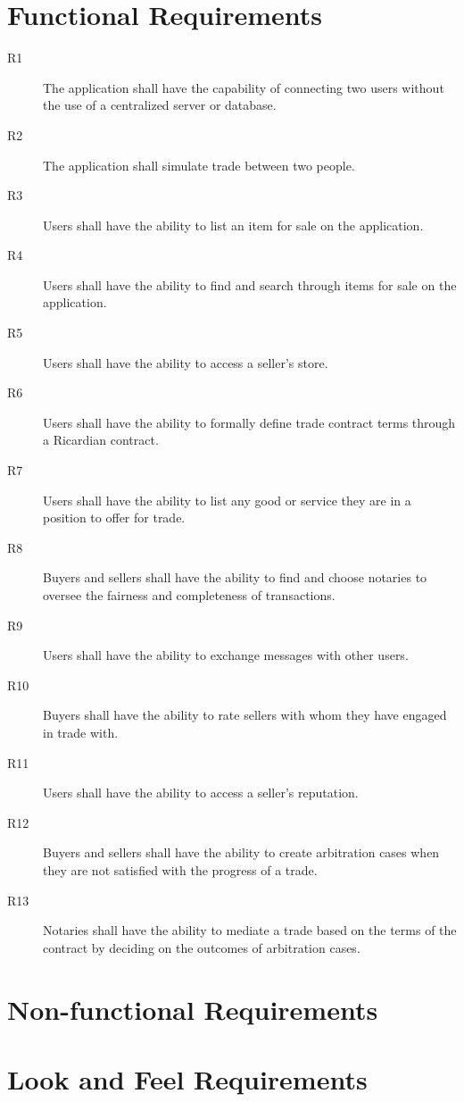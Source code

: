 \documentclass{article}
\begin{document}
\section*{Functional Requirements}
\begin{description}
\item[R1]
The application shall have the capability of connecting two users without the use of a centralized server or database.
\item[R2]
The application shall simulate trade between two people.
\item[R3]
Users shall have the ability to list an item for sale on the application.
\item[R4]
Users shall have the ability to find and search through items for sale on the application.
\item[R5]
Users shall have the ability to access a seller's store.
\item[R6]
Users shall have the ability to formally define trade contract terms through a Ricardian contract.
\item[R7]
Users shall have the ability to list any good or service they are in a position to offer for trade.
\item[R8]
Buyers and sellers shall have the ability to find and choose notaries to oversee the fairness and completeness of transactions.
\item[R9]
Users shall have the ability to exchange messages with other users.
\item[R10]
Buyers shall have the ability to rate sellers with whom they have engaged in trade with.
\item[R11]
Users shall have the ability to access a seller's reputation.
\item[R12]
Buyers and sellers shall have the ability to create arbitration cases when they are not satisfied with the progress of a trade.
\item[R13]
Notaries shall have the ability to mediate a trade based on the terms of the contract by deciding on the outcomes of arbitration cases.


\end{description}

\color{red}
\section*{Non-functional Requirements}

\section{Look and Feel Requirements}
\end{document}
